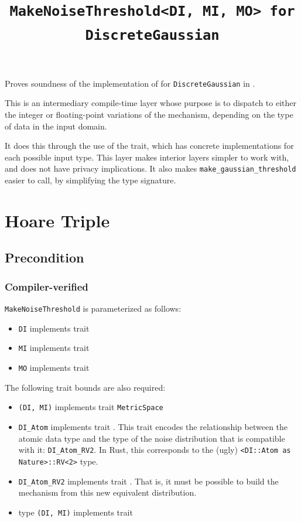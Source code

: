 \documentclass{article}
\title{\texttt{MakeNoiseThreshold<DI, MI, MO> for DiscreteGaussian}}
\author{\MichaelShoemateAuthor}
\date{}
\begin{document}
\maketitle

\contrib
Proves soundness of the implementation of 
for \texttt{DiscreteGaussian} in .

This is an intermediary compile-time layer whose purpose is
to dispatch to either the integer or floating-point variations of the mechanism,
depending on the type of data in the input domain.

It does this through the use of the  trait,
which has concrete implementations for each possible input type.
This layer makes interior layers simpler to work with, and does not have privacy implications.
It also makes \texttt{make\_gaussian\_threshold} easier to call,
by simplifying the type signature.

\section{Hoare Triple}
\subsection*{Precondition}
\subsubsection*{Compiler-verified}
\texttt{MakeNoiseThreshold} is parameterized as follows:
\begin{itemize}
    \item \texttt{DI} implements trait 
    \item \texttt{MI} implements trait 
    \item \texttt{MO} implements trait 
\end{itemize}

The following trait bounds are also required:
\begin{itemize}
    \item \texttt{(DI, MI)} implements trait \texttt{MetricSpace}
    \item \texttt{DI\_Atom} implements trait .
        This trait encodes the relationship between the atomic data type
        and the type of the noise distribution that is compatible with it: \texttt{DI\_Atom\_RV2}.
        In Rust, this corresponds to the (ugly) \texttt{<DI::Atom as Nature>::RV<2>} type.
    \item \texttt{DI\_Atom\_RV2} implements trait .
        That is, it must be possible to build the mechanism from this new equivalent distribution.
    \item type \texttt{(DI, MI)} implements trait 
\end{itemize}
\end{document}
